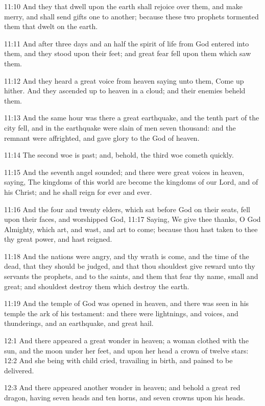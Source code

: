 11:10 And they that dwell upon the earth shall rejoice over them, and make merry, and shall send gifts one to another; because these two prophets tormented them that dwelt on the earth.

11:11 And after three days and an half the spirit of life from God entered into them, and they stood upon their feet; and great fear fell upon them which saw them.

11:12 And they heard a great voice from heaven saying unto them, Come up hither. And they ascended up to heaven in a cloud; and their enemies beheld them.

11:13 And the same hour was there a great earthquake, and the tenth part of the city fell, and in the earthquake were slain of men seven thousand: and the remnant were affrighted, and gave glory to the God of heaven.

11:14 The second woe is past; and, behold, the third woe cometh quickly.

11:15 And the seventh angel sounded; and there were great voices in heaven, saying, The kingdoms of this world are become the kingdoms of our Lord, and of his Christ; and he shall reign for ever and ever.

11:16 And the four and twenty elders, which sat before God on their seats, fell upon their faces, and worshipped God, 11:17 Saying, We give thee thanks, O \LORD God Almighty, which art, and wast, and art to come; because thou hast taken to thee thy great power, and hast reigned.

11:18 And the nations were angry, and thy wrath is come, and the time of the dead, that they should be judged, and that thou shouldest give reward unto thy servants the prophets, and to the saints, and them that fear thy name, small and great; and shouldest destroy them which destroy the earth.

11:19 And the temple of God was opened in heaven, and there was seen in his temple the ark of his testament: and there were lightnings, and voices, and thunderings, and an earthquake, and great hail.

12:1 And there appeared a great wonder in heaven; a woman clothed with the sun, and the moon under her feet, and upon her head a crown of twelve stars: 12:2 And she being with child cried, travailing in birth, and pained to be delivered.

12:3 And there appeared another wonder in heaven; and behold a great red dragon, having seven heads and ten horns, and seven crowns upon his heads.

